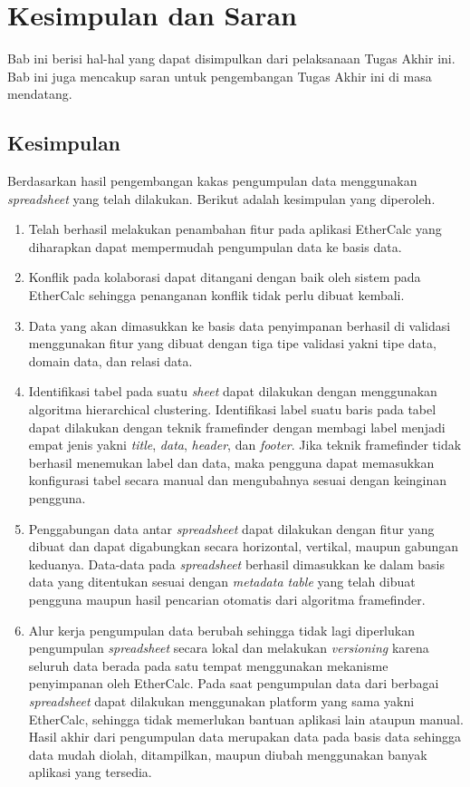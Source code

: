 \chapter{Kesimpulan dan Saran}
Bab ini berisi hal-hal yang dapat disimpulkan dari pelaksanaan Tugas Akhir ini. Bab ini juga mencakup saran untuk pengembangan Tugas Akhir ini di masa mendatang.

\section{Kesimpulan}
Berdasarkan hasil pengembangan kakas pengumpulan data menggunakan \textit{spreadsheet} yang telah dilakukan. Berikut adalah kesimpulan yang diperoleh.
\begin{enumerate}
	\item Telah berhasil melakukan penambahan fitur pada aplikasi EtherCalc yang diharapkan dapat mempermudah pengumpulan data ke basis data.
	\item Konflik pada kolaborasi dapat ditangani dengan baik oleh sistem pada EtherCalc sehingga penanganan konflik tidak perlu dibuat kembali.
	\item Data yang akan dimasukkan ke basis data penyimpanan berhasil di validasi menggunakan fitur yang dibuat dengan tiga tipe validasi yakni tipe data, domain data, dan relasi data.
	\item Identifikasi tabel pada suatu \textit{sheet} dapat dilakukan dengan menggunakan algoritma hierarchical clustering. Identifikasi label suatu baris pada tabel dapat dilakukan dengan teknik framefinder dengan membagi label menjadi empat jenis yakni \textit{title}, \textit{data}, \textit{header}, dan \textit{footer}. Jika teknik framefinder tidak berhasil menemukan label dan data, maka pengguna dapat memasukkan konfigurasi tabel secara manual dan mengubahnya sesuai dengan keinginan pengguna. 
	\item Penggabungan data antar \textit{spreadsheet} dapat dilakukan dengan fitur yang dibuat dan dapat digabungkan secara horizontal, vertikal, maupun gabungan keduanya. Data-data pada \textit{spreadsheet} berhasil dimasukkan ke dalam basis data yang ditentukan sesuai dengan \textit{metadata table} yang telah dibuat pengguna maupun hasil pencarian otomatis dari algoritma framefinder.
	\item Alur kerja pengumpulan data berubah sehingga tidak lagi diperlukan pengumpulan \textit{spreadsheet} secara lokal dan melakukan \textit{versioning} karena seluruh data berada pada satu tempat menggunakan mekanisme penyimpanan oleh EtherCalc. Pada saat pengumpulan data dari berbagai \textit{spreadsheet} dapat dilakukan menggunakan platform yang sama yakni EtherCalc, sehingga tidak memerlukan bantuan aplikasi lain ataupun manual. Hasil akhir dari pengumpulan data merupakan data pada basis data sehingga data mudah diolah, ditampilkan, maupun diubah menggunakan banyak aplikasi yang tersedia.
\end{enumerate}

